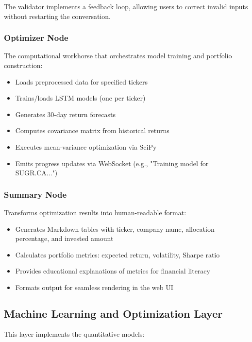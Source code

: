\documentclass[conference]{IEEEtran}
\begin{document}
The validator implements a feedback loop, allowing users to correct invalid inputs without restarting the conversation.

\subsubsection{Optimizer Node}
The computational workhorse that orchestrates model training and portfolio construction:
\begin{itemize}
\item Loads preprocessed data for specified tickers
\item Trains/loads LSTM models (one per ticker)
\item Generates 30-day return forecasts
\item Computes covariance matrix from historical returns
\item Executes mean-variance optimization via SciPy
\item Emits progress updates via WebSocket (e.g., "Training model for SUGR.CA...")
\end{itemize}

\subsubsection{Summary Node}
Transforms optimization results into human-readable format:
\begin{itemize}
\item Generates Markdown tables with ticker, company name, allocation percentage, and invested amount
\item Calculates portfolio metrics: expected return, volatility, Sharpe ratio
\item Provides educational explanations of metrics for financial literacy
\item Formats output for seamless rendering in the web UI
\end{itemize}

\subsection{Machine Learning and Optimization Layer}

This layer implements the quantitative models:
\end{document}
